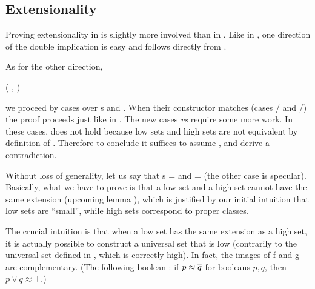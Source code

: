 \subsection{Extensionality}
Proving extensionality in \NFTWO{} is slightly more involved than in \ZF{}. Like in \ZF{}, one direction of the double implication is easy and follows directly from .

As for the other direction, \ie{} \\
\centerline{
  (\coqdockw{\ensuremath{\forall}} ,  \INX {}   \INX {}) %
   \EQX {}
}

\noindent
we proceed by cases over \var s and . When their constructor matches (cases / and /) the proof proceeds just like in \ZF{}. The new cases  \emph{vs}  require some more work. In these cases,  \EQX {} does not hold because low sets and high sets are not equivalent by definition of . Therefore to conclude it suffices to assume \coqdockw{\ensuremath{\forall}} ,  \INX {}   \INX {} and derive a contradiction.

Without loss of generality, let us say that \var s =    and  =    (the other case is specular). Basically, what we have to prove is that a low set and a high set cannot have the same extension (upcoming lemma ), which is justified by our initial intuition that low sets are ``small'', while high sets correspond to proper classes.

\medskip

The crucial intuition is that when a low set has the same extension as a high set, it is actually possible to construct a universal set that is low (contrarily to the universal set defined in , which is correctly high). In fact, the images of \var f and \var g are complementary. (The following boolean \TODO{}: if $p \approx \overline{q}$ for booleans $p,q$, then $p \lor q \approx \top$.)

